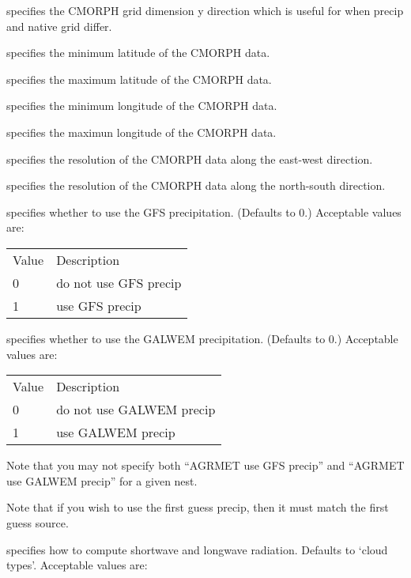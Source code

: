   specifies the CMORPH grid dimension
 y direction which is useful for when precip and native grid differ.

  specifies the minimum latitude of
 the CMORPH data.

  specifies the maximum latitude of
 the CMORPH data.

  specifies the minimum longitude of
 the CMORPH data.

  specifies the maximun longitude of
 the CMORPH data.

  specifies the resolution of the CMORPH data
 along the east-west direction.

  specifies the resolution of the CMORPH data
 along the north-south direction.

  specifies whether to use 
 the GFS precipitation.  (Defaults to 0.)
 Acceptable values are:

 \begin{tabular}{ll}
 Value & Description                   \\
 0     & do not use GFS precip         \\
 1     & use GFS precip                \\
 \end{tabular}

  specifies whether to use
 the GALWEM precipitation.  (Defaults to 0.)
 Acceptable values are:

 \begin{tabular}{ll}
 Value & Description              \\
 0     & do not use GALWEM precip \\
 1     & use GALWEM precip        \\
 \end{tabular}

 Note that you may not specify both ``AGRMET use GFS precip'' and
 ``AGRMET use GALWEM precip'' for a given nest.

 Note that if you wish to use the first guess precip, then it must
 match the first guess source.

  specifies how to compute
 shortwave and longwave radiation.  Defaults to `cloud types'.
 Acceptable values are:

